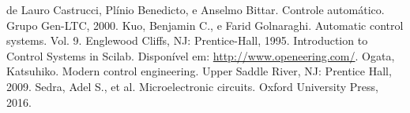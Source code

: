 \begin{thebibliography}{99}
 de Lauro Castrucci, Plínio Benedicto, e Anselmo Bittar. Controle automático. Grupo Gen-LTC, 2000.
 Kuo, Benjamin C., e Farid Golnaraghi. Automatic control systems. Vol. 9. Englewood Cliffs, NJ: Prentice-Hall, 1995.
 Introduction to Control Systems in Scilab. Disponível em: \url{http://www.openeering.com/}.
 Ogata, Katsuhiko. Modern control engineering. Upper Saddle River, NJ: Prentice Hall, 2009.
 Sedra, Adel S., et al. Microelectronic circuits. Oxford University Press, 2016.
\end{thebibliography}

\pagebreak